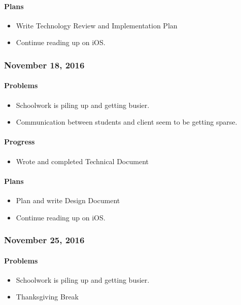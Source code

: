 \paragraph{Plans}\label{plans}
\begin{itemize}
\tightlist
\item
  Write Technology Review and Implementation Plan
\item
  Continue reading up on iOS.
\end{itemize}

\subsubsection{November 18, 2016}\label{section}
\paragraph{Problems}\label{problems}
\begin{itemize}
\tightlist
\item
  Schoolwork is piling up and getting busier.
\item
  Communication between students and client seem to be getting sparse.
\end{itemize}
\paragraph{Progress}\label{progress}
\begin{itemize}
\tightlist
\item
  Wrote and completed Technical Document
\end{itemize}
\paragraph{Plans}\label{plans}
\begin{itemize}
\tightlist
\item
  Plan and write Design Document
\item
  Continue reading up on iOS.
\end{itemize}

\subsubsection{November 25, 2016}\label{section}
\paragraph{Problems}\label{problems}
\begin{itemize}
\tightlist
\item
  Schoolwork is piling up and getting busier.
\item
  Thanksgiving Break
\end{itemize}
